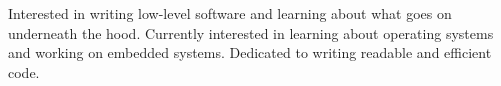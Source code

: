 
\begin{cvparagraph}
    Interested in writing low-level software and learning about what goes on underneath the hood.
    Currently interested in learning about operating systems and working on embedded systems.
    Dedicated to writing readable and efficient code.
\end{cvparagraph}

